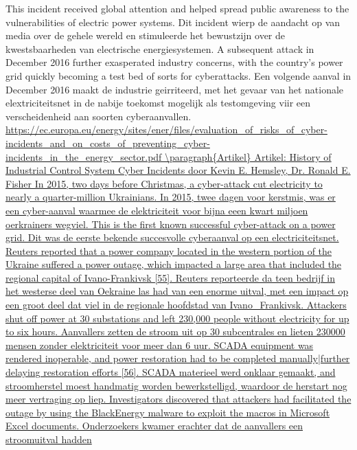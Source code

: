 This incident received global attention and helped spread public awareness to the vulnerabilities of
electric power systems. Dit incident wierp de aandacht op van media over de gehele wereld en
stimuleerde het bewustzijn over de kwestsbaarheden van electrische energiesystemen.
A subsequent attack in December 2016 further exasperated industry concerns, with the country’s
power grid quickly becoming a test bed of sorts for cyberattacks. Een volgende aanval in December
2016 maakt de industrie geirriteerd, met het gevaar van het nationale elextriciteitsnet in de nabije
toekomst mogelijk als testomgeving viir een verscheidenheid aan soorten cyberaanvallen.
\url{https://ec.europa.eu/energy/sites/ener/files/evaluation_of_risks_of_cyber-
incidents_and_on_costs_of_preventing_cyber-incidents_in_the_energy_sector.pdf
\paragraph{Artikel}
Artikel: History of Industrial Control System Cyber Incidents door Kevin E.
Hemsley, Dr. Ronald E. Fisher
In 2015, two days before Christmas, a cyber-attack cut electricity to nearly a quarter-million
Ukrainians. In 2015, twee dagen voor kerstmis, was er een cyber-aanval waarmee de
elektriciteit voor bijna eeen kwart miljoen oerkrainers wegviel.
This is the first known successful cyber-attack on a power grid. Dit was de eerste bekende
succesvolle cyberaanval op een electriciteitsnet.
Reuters reported that a power company located in the western portion
of the Ukraine suffered a power outage, which impacted a large area that
included the regional capital of Ivano-Frankivsk [55]. Reuters reporteerde da teen bedrijf in
het westerse deel van Oekraine las had van een enorme uitval, met een impact op een groot
deel dat viel in de regionale hoofdstad van Ivano_Frankivsk.
Attackers shut off power at 30 substations and left 230,000 people without electricity for
up to six hours. Aanvallers zetten de stroom uit op 30 subcentrales en lieten 230000
mensen zonder elektriciteit voor meer dan 6 uur.
SCADA equipment was rendered inoperable, and power
restoration had to be completed manually|further delaying restoration
efforts [56]. SCADA materieel werd onklaar gemaakt, and stroomherstel moest handmatig
worden bewerkstelligd, waardoor de herstart nog meer vertraging op liep.
Investigators discovered that attackers had facilitated the outage by
using the BlackEnergy malware to exploit the macros in Microsoft Excel
documents. Onderzoekers kwamer erachter dat de aanvallers een stroomuitval hadden
}

